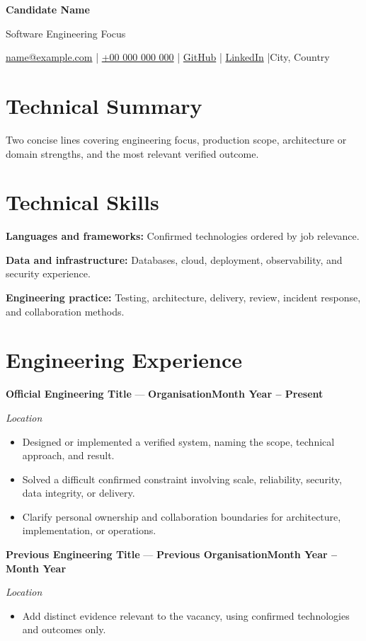 \documentclass[10pt,a4paper]{article}
\newcommand{\role}[4]{%
  \textbf{#1} --- \textbf{#3}\hfill\textbf{#2}\par
  \textit{#4}\par\vspace{-3pt}
}
\begin{document}
\color{text}
\raggedright

\begin{center}
  {\fontsize{23}{26}\selectfont\bfseries Candidate Name}\par
  {\large\color{accent}Software Engineering Focus}\par
  \vspace{2pt}
  \href{mailto:name@example.com}{name@example.com} \enspace|\enspace
  \href{tel:+00000000000}{+00 000 000 000} \enspace|\enspace
  \href{https://github.com/}{GitHub} \enspace|\enspace
  \href{https://www.linkedin.com/}{LinkedIn} \enspace|\enspace City, Country
\end{center}

\section{Technical Summary}
Two concise lines covering engineering focus, production scope, architecture or domain strengths, and the most relevant verified outcome.

\section{Technical Skills}
\textbf{Languages and frameworks:} Confirmed technologies ordered by job relevance.\par
\textbf{Data and infrastructure:} Databases, cloud, deployment, observability, and security experience.\par
\textbf{Engineering practice:} Testing, architecture, delivery, review, incident response, and collaboration methods.

\section{Engineering Experience}
\role{Official Engineering Title}{Month Year -- Present}{Organisation}{Location}
\begin{itemize}
  \item Designed or implemented a verified system, naming the scope, technical approach, and result.
  \item Solved a difficult confirmed constraint involving scale, reliability, security, data integrity, or delivery.
  \item Clarify personal ownership and collaboration boundaries for architecture, implementation, or operations.
\end{itemize}

\role{Previous Engineering Title}{Month Year -- Month Year}{Previous Organisation}{Location}
\begin{itemize}
  \item Add distinct evidence relevant to the vacancy, using confirmed technologies and outcomes only.
\end{itemize}
\end{document}
